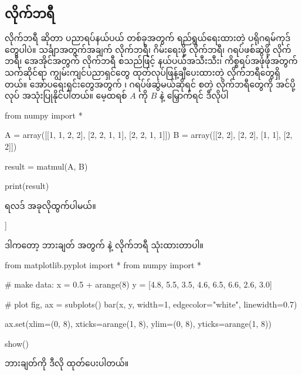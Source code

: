 \subsection*{လိုက်ဘရီ}
လိုက်ဘရီ  ဆိုတာ ပညာရပ်နယ်ပယ် တစ်ခုအတွက် ရည်ရွယ်ရေးထားတဲ့ ပရိုဂရမ်ကုဒ်တွေပါပဲ။ သင်္ချာအတွက်အချက် လိုက်ဘရီ၊ ဂိမ်းရေးဖို့ လိုက်ဘရီ၊  ဂရပ်ဖစ်ဆွဲဖို့ လိုက်ဘရီ၊ အေအိုင်အတွက် လိုက်ဘရီ စသည်ဖြင့် နယ်ပယ်အသီးသီး၊ ကိစ္စရပ်အဖုံဖုံအတွက် သက်ဆိုင်ရာ ကျွမ်းကျင်ပညာရှင်တွေ ထုတ်လုပ်ဖြန့်ချီပေးထားတဲ့ လိုက်ဘရီတွေရှိတယ်။  အော်ပရေးရှင်းတွေအတွက်  ၊ ဂရပ်ဖ်ဆွဲမယ်ဆိုရင်  စတဲ့ လိုက်ဘရီတွေကို အင်ပို့လုပ် အသုံးပြုနိုင်ပါတယ်။ မေ့ထရစ် $A$ ကို $B$ နဲ့ မြှောက်ရင် ဒီလိုပါ 
%
\begin{py}
from numpy import *

A = array([[1, 1, 2, 2],
           [2, 2, 1, 1],
           [2, 2, 1, 1]])
B = array([[2, 2],
           [2, 2],
           [1, 1],
           [2, 2]])

result = matmul(A, B)

print(result)

\end{py}
%
ရလဒ် အခုလိုထွက်ပါမယ်။ 
%
\begin{codetxt}
[[10 10]
 [11 11]
 [11 11]]
\end{codetxt}
%
ဒါကတော့ ဘားချတ် အတွက်  နဲ့  လိုက်ဘရီ သုံးထားတာပါ။  
%
\begin{py}
from matplotlib.pyplot import *
from numpy import *

# make data:
x = 0.5 + arange(8)
y = [4.8, 5.5, 3.5, 4.6, 6.5, 6.6, 2.6, 3.0]

# plot
fig, ax = subplots()
bar(x, y, width=1, edgecolor="white", linewidth=0.7)

ax.set(xlim=(0, 8), xticks=arange(1, 8),
       ylim=(0, 8), yticks=arange(1, 8))

show()
\end{py}
ဘားချတ်ကို ဒီလို ထုတ်ပေးပါတယ်။
%
\begin{figure}[tbh!]
\caption{} 
\label{fig:}
\end{figure}

